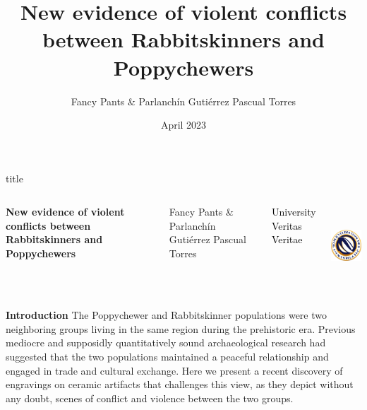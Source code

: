 \documentclass[final]{beamer}
\title[R\&P peace]{New evidence of violent conflicts between Rabbitskinners and Poppychewers}
\author[Pants]{Fancy Pants \& Parlanchín Gutiérrez Pascual Torres}
\date{April 2023}
\begin{document}
\begin{frame}[t]
    \vspace{-.5cm}
    \begin{beamercolorbox}[wd=\paperwidth]{title}
    \vspace{2cm}
        \begin{columns}


            {
                \raggedleft
                \textcolor{redcaa}{\textbf{New evidence of violent conflicts between Rabbitskinners and Poppychewers}} \par
                \textcolor{redcaa}{Fancy Pants \& Parlanchín Gutiérrez Pascual Torres}\par
                \textcolor{black}{University Veritas Veritae}\par
            }

            \includegraphics[height=3cm]{universHS.png}
        \end{columns}
    \vspace{.8cm}

    \end{beamercolorbox}


    \vspace{.5cm}


    \begin{columns}[t]

        \begin{block}{\textbf{Introduction}}
            The Poppychewer and Rabbitskinner populations were two neighboring groups living in the same region during the prehistoric era. Previous mediocre and supposidly quantitatively sound archaeological research had suggested that the two populations maintained a peaceful relationship and engaged in trade and cultural exchange. Here we present a recent discovery of engravings on ceramic artifacts that challenges this view, as they depict without any doubt, scenes of conflict and violence between the two groups.
        \end{block}


\end{columns}
\end{frame}
\end{document}
